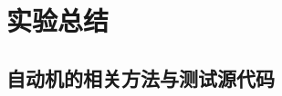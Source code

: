 \documentclass[pdfCover]{myreport} %
\begin{document}
\section{实验总结}




\nocite{alfred_v_aho_compilers_2006}
\nocite{automata-from-regex}

\begin{appendices}
  \section{自动机的相关方法与测试源代码}
    
\end{appendices}
\end{document}
